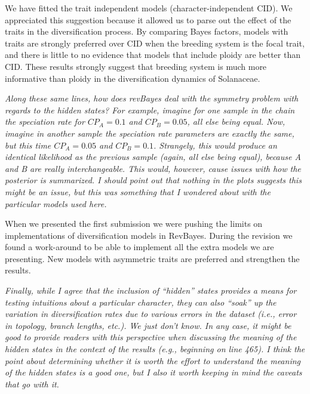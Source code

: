 \documentclass[11pt]{article}
\renewenvironment{quote}{\bigskip\noindent\itshape\ignorespaces}{\smallskip}
\begin{document}
We have fitted the trait independent models (character-independent CID). We appreciated this suggestion because it allowed us to parse out the effect of the traits in the diversification process. By comparing Bayes factors, models with traits are strongly preferred over CID when the breeding system is the focal trait, and there is little to no evidence that models that include ploidy are better than CID. These results strongly suggest that breeding system is much more informative than ploidy in the diversification dynamics of Solanaceae.

\begin{quote}
Along these same lines, how does revBayes deal with the symmetry problem with regards to the hidden states?
For example, imagine for one sample in the chain the speciation rate for $CP_A=0.1$ and $CP_B=0.05$, all else being equal.
Now, imagine in another sample the speciation rate parameters are exactly the same, but this time $CP_A=0.05$ and $CP_B=0.1$. 
Strangely, this would produce an identical likelihood as the previous sample (again, all else being equal), because A and B are really interchangeable.
This would, however, cause issues with how the posterior is summarized.
I should point out that nothing in the plots suggests this might be an issue, but this was something that I wondered about with the particular models used here.
\end{quote}

When we presented the first submission we were pushing the limits on implementations of diversification models in RevBayes. During the revision we found a work-around to be able to implement all the extra models we are presenting. New models with asymmetric traits are preferred and strengthen the results.

\begin{quote}
Finally, while I agree that the inclusion of ``hidden'' states provides a means for testing intuitions about a particular character, they can also ``soak'' up the variation in diversification rates due to various errors in the dataset (i.e., error in topology, branch lengths, etc.).
We just don't know.
In any case, it might be good to provide readers with this perspective when discussing the meaning of the hidden states in the context of the results (e.g., beginning on line 465).
I think the point about determining whether it is worth the effort to understand the meaning of the hidden states is a good one, but I also it worth keeping in mind the caveats that go with it.
\end{quote}
\end{document}

